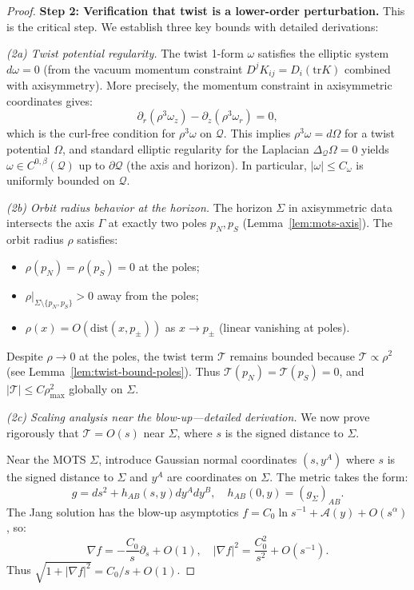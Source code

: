 \documentclass[12pt]{article}
\theoremstyle{plain}
\theoremstyle{definition}
\theoremstyle{remark}
\newcommand{\tr}{\mathrm{tr}}
\begin{document}
\begin{proof}
\textbf{Step 2: Verification that twist is a lower-order perturbation.}
This is the critical step. We establish three key bounds with detailed derivations:

\textit{(2a) Twist potential regularity.} The twist 1-form $\omega$ satisfies the elliptic system $d\omega = 0$ (from the vacuum momentum constraint $D^j K_{ij} = D_i(\tr K)$ combined with axisymmetry). More precisely, the momentum constraint in axisymmetric coordinates gives:
\[
\partial_r(\rho^3 \omega_z) - \partial_z(\rho^3 \omega_r) = 0,
\]
which is the curl-free condition for $\rho^3 \omega$ on $\mathcal{Q}$. This implies $\rho^3 \omega = d\Omega$ for a twist potential $\Omega$, and standard elliptic regularity for the Laplacian $\Delta_{\mathcal{Q}} \Omega = 0$ \cite{gilbargtrudinger2001} yields $\omega \in C^{0,\beta}(\mathcal{Q})$ up to $\partial\mathcal{Q}$ (the axis and horizon). In particular, $|\omega| \leq C_\omega$ is uniformly bounded on $\mathcal{Q}$.

\textit{(2b) Orbit radius behavior at the horizon.} The horizon $\Sigma$ in axisymmetric data intersects the axis $\Gamma$ at exactly two poles $p_N, p_S$ (Lemma~\ref{lem:mots-axis}). The orbit radius $\rho$ satisfies:
\begin{itemize}
    \item $\rho(p_N) = \rho(p_S) = 0$ at the poles;
    \item $\rho|_{\Sigma \setminus \{p_N, p_S\}} > 0$ away from the poles;
    \item $\rho(x) = O(\mathrm{dist}(x, p_\pm))$ as $x \to p_\pm$ (linear vanishing at poles).
\end{itemize}
Despite $\rho \to 0$ at the poles, the twist term $\mathcal{T}$ remains bounded because $\mathcal{T} \propto \rho^2$ (see Lemma~\ref{lem:twist-bound-poles}). Thus $\mathcal{T}(p_N) = \mathcal{T}(p_S) = 0$, and $|\mathcal{T}| \leq C\rho_{\max}^2$ globally on $\Sigma$.

\textit{(2c) Scaling analysis near the blow-up---detailed derivation.} We now prove rigorously that $\mathcal{T} = O(s)$ near $\Sigma$, where $s$ is the signed distance to $\Sigma$.

Near the MOTS $\Sigma$, introduce Gaussian normal coordinates $(s, y^A)$ where $s$ is the signed distance to $\Sigma$ and $y^A$ are coordinates on $\Sigma$. The metric takes the form:
\[
g = ds^2 + h_{AB}(s, y) dy^A dy^B, \quad h_{AB}(0, y) = (g_\Sigma)_{AB}.
\]
The Jang solution has the blow-up asymptotics $f = C_0 \ln s^{-1} + \mathcal{A}(y) + O(s^\alpha)$, so:
\[
\nabla f = -\frac{C_0}{s} \partial_s + O(1), \quad |\nabla f|^2 = \frac{C_0^2}{s^2} + O(s^{-1}).
\]
Thus $\sqrt{1 + |\nabla f|^2} = C_0/s + O(1)$.


\end{proof}
\end{document}
